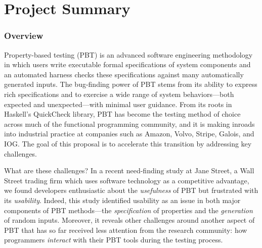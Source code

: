 \section*{Project Summary}

\newcommand{\summarysection}[1]{\vspace{-2mm}\subsubsection*{#1}\vspace{-1mm}}


\summarysection{Overview}
Property-based testing (PBT) is an advanced software engineering
methodology in which users write executable formal specifications of system
components
and an automated harness checks these specifications against
many automatically generated inputs.  The bug-finding power of PBT
stems from its ability to express rich specifications and to
exercise a wide range of system behaviors---both
expected and unexpected---with minimal user guidance.
%
From its roots in Haskell's QuickCheck library, PBT has become
the testing method of choice across much of the functional programming
community, and it is making inroads into industrial practice
at companies such as Amazon, Volvo, Stripe, Galois, and IOG.
%
The goal of this proposal is to accelerate this transition
by addressing key challenges.

What are these challenges?
In a recent need-finding study at Jane
Street, a Wall Street trading firm which uses software
technology as a competitive advantage, we found developers enthusiastic
about the {\em usefulness} of PBT but frustrated with its {\em usability}.
%
Indeed, this study identified usability as an issue in both major components
of PBT methods---the {\em specification} of properties and the {\em
  generation} of random inputs. Moreover, it reveals other challenges
around another aspect of PBT that has so far received less
attention from the research community: how programmers {\em interact}
with their PBT tools during the testing process.


